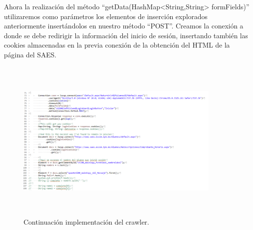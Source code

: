 		\noindent Ahora la realización del método “getData(HashMap<String,String> formFields)” utilizaremos como parámetros los elementos de inserción explorados anteriormente insertándolos en nuestro método “POST”. Creamos la conexión a donde se debe redirigir la información del inicio de sesión, insertando también las cookies almacenadas en la previa conexión de la obtención del HTML de la página del SAES.\\
		
		\begin{figure} [hbt!]
			\centering
			\includegraphics[width=10cm, height=8cm]{Imagenes/Crawler/Codigo3}
			\caption{Continuación implementación del crawler.}
			\label{codigo3}
		\end{figure}
	\pagebreak
	
